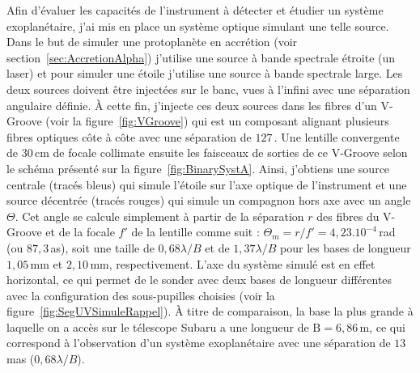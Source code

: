 Afin d'évaluer les capacités de l'instrument à détecter et étudier un système exoplanétaire, j'ai mis en place un système optique simulant une telle source. Dans le but de simuler une protoplanète en accrétion (voir section~\ref{sec:AccretionAlpha}) j'utilise une source à bande spectrale étroite (un laser) et pour simuler une étoile j'utilise une source à bande spectrale large. Les deux sources doivent être injectées sur le banc, vues à l'infini avec une séparation angulaire définie. À cette fin, j'injecte ces deux sources dans les fibres d'un V-Groove (voir la figure~\ref{fig:VGroove}) qui est un composant alignant plusieurs fibres optiques côte à côte avec une séparation de $127 \,$\um. Une lentille convergente de $30 \,$cm de focale collimate ensuite les faisceaux de sorties de ce V-Groove selon le schéma présenté sur la figure~\ref{fig:BinarySystA}. Ainsi, j'obtiens une source centrale (tracés bleus) qui simule l'étoile sur l'axe optique de l'instrument et une source décentrée (tracés rouges) qui simule un compagnon hors axe avec un angle $\Theta$. Cet angle se calcule simplement à partir de la séparation $r$ des fibres du V-Groove et de la focale $f'$ de la lentille comme suit : $\Theta_m = r / f' = 4,23 . 10^{-4} \,$rad (ou $87,3 \,$as), soit une taille de $0,68 \lambda / B$ et de $1,37 \lambda / B$ pour les bases de longueur $1,05 \,$mm et $2,10 \,$mm, respectivement. L'axe du système simulé est en effet horizontal, ce qui permet de le sonder avec deux bases de longueur différentes avec la configuration des sous-pupilles choisies (voir la figure~\ref{fig:SegUVSimuleRappel}). À titre de comparaison, la base la plus grande à laquelle on a accès sur le télescope Subaru a une longueur de $\text{B} = 6,86 \,$m, ce qui correspond à l'observation d'un système exoplanétaire avec une séparation de $13 \,$mas ($0,68 \lambda / B$).

